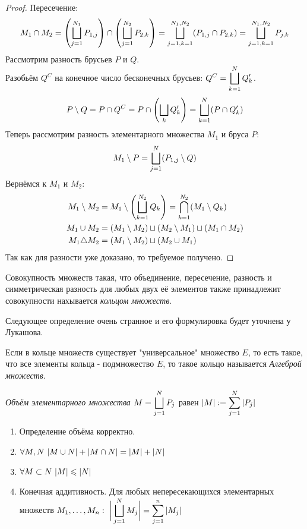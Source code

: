 \begin{proof}
	Пересечение:
	\[M_1\cap M_2=\left(\bigsqcup_{j=1}^{N_1}P_{1,j}\right)\cap\left(\bigsqcup_{j=1}^{N_2}P_{2,k}\right)=\bigsqcup_{j=1,k=1}^{N_1,N_2}(P_{1,j}\cap P_{2,k})=\bigsqcup_{j=1,k=1}^{N_1,N_2}P_{j,k}\]
	Рассмотрим разность брусьев $P$ и $Q$.\\
	Разобьём $Q^C$ на конечное число бесконечных брусьев: $\displaystyle Q^C=\bigsqcup_{k=1}^NQ_k'$.
	\[P\setminus Q=P\cap Q^C=P\cap\left(\bigsqcup_{k}Q_k'\right)=\bigsqcup_{k=1}^N(P\cap Q_k')\]
	Теперь рассмотрим разность элементарного множества $M_1$ и бруса $P$:
	\[M_1\setminus P=\bigsqcup_{j=1}^N(P_{1,j}\setminus Q)\]
	Вернёмся к $M_1$ и $M_2$:
	\begin{equation*}
		\begin{split}
			M_1\setminus M_2&=M_1\setminus\left(\bigsqcup_{k=1}^{N_2}Q_k\right)=\bigcap_{k=1}^{N_2}(M_1\setminus Q_k)\\
			M_1\cup M_2&=(M_1\setminus M_2)\sqcup(M_2\setminus M_1)\sqcup(M_1\cap M_2)\\
			M_1\triangle M_2&=(M_1\setminus M_2)\sqcup(M_2\cup M_1)
		\end{split}
	\end{equation*}
	Так как для разности уже доказано, то требуемое получено.
\end{proof}
\begin{definition}
	Совокупность множеств такая, что объединение, пересечение, разность и симметрическая разность для любых двух её элементов также принадлежит совокупности нахывается \textit{кольцом множеств}.
\end{definition}
\begin{anote}
	Следующее определение очень странное и его формулировка будет уточнена у Лукашова.
\end{anote}
\begin{definition}
	Если в кольце множеств существует "универсальное" множество $E$, то есть такое, что все элементы кольца - подмножество $E$, то такое кольцо называется \textit{Алгеброй множеств}.
\end{definition}
\begin{definition}
	\textit{Объём элементарного множества} $\displaystyle M=\bigsqcup_{j=1}^NP_j$ равен $\ds|M|:=\sum_{j=1}^N|P_j|$
\end{definition}
\begin{theorem}\label{19_th1}
	\begin{enumerate}
		\item Определение объёма корректно.
		\item $\forall M,N\ |M\cup N|+|M\cap N|=|M|+|N|$
		\item $\fa M\subset N\ |M|\le|N|$
		\item Конечная аддитивность. Для любых непересекающихся элементарных множеств $\ds M_1,\dots,M_n:\ \bigg|\bsc_{j=1}^NM_j\bigg|=\sum_{j=1}^n|M_j|$
	\end{enumerate}
\end{theorem}
